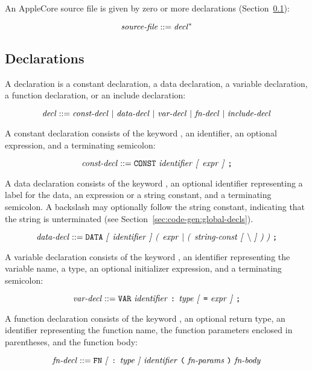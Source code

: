 \documentclass[10pt]{article}
\begin{document}
An AppleCore source file is given by zero or more
declarations (Section~\ref{sec:syntax:decls}):

$$\mbox{\textit{source-file}} ::= \mbox{\textit{decl}}^*$$

\subsection{Declarations}
\label{sec:syntax:decls}

A declaration is a constant declaration, a data declaration, a
variable declaration, a function declaration, or an include
declaration:

$$\mbox{\textit{decl}} ::= \mbox{\ensuremath{\mbox{\textit{const-decl}}} $|$
  \ensuremath{\mbox{\textit{data-decl}}} $|$ \ensuremath{\mbox{\textit{var-decl}}} $|$ \ensuremath{\mbox{\textit{fn-decl}}}
    $|$ \ensuremath{\mbox{\textit{include-decl}}}}$$

 A constant declaration consists of the
keyword , an identifier, an optional expression, and a
terminating semicolon:

$$\mbox{\textit{const-decl}} ::= \mbox{\texttt{CONST} \ensuremath{\mbox{\textit{identifier}}}
  \textit{[} \ensuremath{\mbox{\textit{expr}}} \textit{]} \texttt{;}}$$

 A data declaration consists of the keyword
, an optional identifier representing a label for the data,
an expression or a string constant, and a terminating semicolon.  A
backslash may optionally follow the string constant, indicating that
the string is unterminated (see
Section~\ref{sec:code-gen:global-decls}).

$$\nonterm{data-decl} ::= \mbox{\kwd{DATA} \opt{\nonterm{identifier}}
  \group{\nonterm{expr} $|$ \group{\nonterm{string-const} \opt{\bs}}}
  \kwd{;}}$$

 A variable declaration consists of the
keyword , an identifier representing the variable name, a
type, an optional initializer expression, and a terminating semicolon:

$$\mbox{\textit{var-decl}} ::= \mbox{\texttt{VAR} \ensuremath{\mbox{\textit{identifier}}} \texttt{:}
  \ensuremath{\mbox{\textit{type}}} \textit{[} \texttt{=} \ensuremath{\mbox{\textit{expr}}} \textit{]} \texttt{;}}$$

 A function declaration consists of the
keyword , an optional return type, an identifier representing
the function name, the function parameters enclosed in parentheses,
and the function body:

$$\mbox{\textit{fn-decl}} ::= \mbox{\texttt{FN} \textit{[} \texttt{:} \ensuremath{\mbox{\textit{type}}} \textit{]}
    \ensuremath{\mbox{\textit{identifier}}} \texttt{(} \ensuremath{\mbox{\textit{fn-params}}} \texttt{)}
    \ensuremath{\mbox{\textit{fn-body}}}}$$
\end{document}
